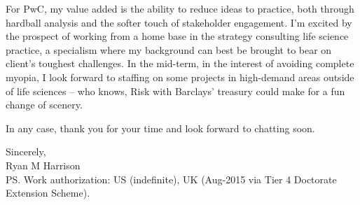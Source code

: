 \documentclass[a4paper]{../res}
\begin{document}
\begin{sloppypar}
\begin{resume}
For PwC, my value added is the ability to reduce ideas to practice, both through hardball analysis and the softer touch of stakeholder engagement. I'm excited by the prospect of working from a home base in the strategy consulting life science practice, a specialism where my background can best be brought to bear on client's toughest challenges. In the mid-term, in the interest of avoiding complete myopia, I look forward to staffing on some projects in high-demand areas outside of life sciences -- who knows, Risk with Barclays' treasury could make for a fun change of scenery.

In any case, thank you for your time and look forward to chatting soon.

Sincerely, \\
Ryan M Harrison \\
PS. Work authorization: US (indefinite), UK (Aug-2015 via Tier 4 Doctorate Extension Scheme). 


\end{resume} 
\end{sloppypar}
\end{document}
